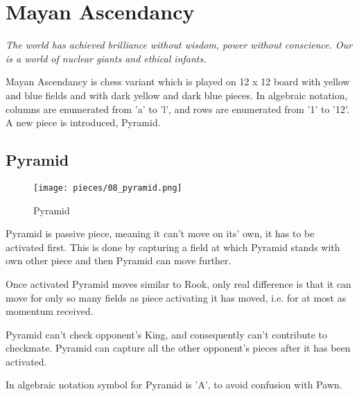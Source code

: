 
\chapter*{Mayan Ascendancy}

\begin{flushright}
\parbox{0.8\textwidth}{
\emph{The world has achieved brilliance without wisdom, power without
conscience. Our is a world of nuclear giants and ethical infants. \\
 } }
\end{flushright}

\noindent
Mayan Ascendancy is chess variant which is played on 12 x 12 board with
yellow and blue fields and with dark yellow and dark blue pieces. In
algebraic notation, columns are enumerated from 'a' to 'l', and rows are
enumerated from '1' to '12'. A new piece is introduced, Pyramid.

\clearpage %

\section*{Pyramid}

\noindent
\begin{wrapfigure}[12]{l}{0.4\textwidth}
\texttt{[image: pieces/08\_pyramid.png]}
\caption{Pyramid}
\label{fig:pyramid}
\end{wrapfigure}
Pyramid is passive piece, meaning it can't move on its' own, it has to be
activated first. This is done by capturing a field at which Pyramid stands
with own other piece and then Pyramid can move further.

Once activated Pyramid moves similar to Rook, only real difference is that
it can move for only so many fields as piece activating it has moved, i.e.
for at most as momentum received.

Pyramid can't check opponent's King, and consequently can't contribute to
checkmate. Pyramid can capture all the other opponent's pieces after it has
been activated.

In algebraic notation symbol for Pyramid is 'A', to avoid confusion with Pawn.

